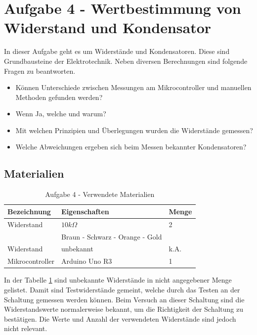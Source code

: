 \section{Aufgabe 4 - Wertbestimmung von Widerstand und Kondensator}
\label{sec:aufgabe-4---wertbestimmung-von-widerstand-und-kondensator}

In dieser Aufgabe geht es um Widerstände und Kondensatoren.
Diese sind Grundbausteine der Elektrotechnik.
Neben diversen Berechnungen sind folgende Fragen zu beantworten.

\begin{itemize}
    \item Können Unterschiede zwischen Messungen am Mikrocontroller und manuellen Methoden gefunden werden?
    \item Wenn Ja, welche und warum?
    \item Mit welchen Prinzipien und Überlegungen wurden die Widerstände gemessen?
    \item Welche Abweichungen ergeben sich beim Messen bekannter Kondensatoren?
\end{itemize}

\subsection{Materialien}
\label{subsec:a4-materialien}

\begin{table}[h]
    \centering
    \caption{Aufgabe 4 - Verwendete Materialien}
    \label{tab:a4-materialien}
    \begin{tabular}{| l | l | l |}
        \hline
        Bezeichnung & Eigenschaften & Menge \\
        \hline
        Widerstand  & $10k\Omega$   & 2     \\
        & Braun - Schwarz - Orange - Gold & \\
        Widerstand & unbekannt & k.A. \\
        Mikrocontroller & Arduino Uno R3 & 1 \\
        \hline
    \end{tabular}
\end{table}

In der Tabelle \ref{tab:a4-materialien} sind unbekannte Widerstände in nicht angegebener Menge gelistet.
Damit sind Testwiderstände gemeint, welche durch das Testen an der Schaltung gemessen werden können.
Beim Versuch an dieser Schaltung sind die Widerstandswerte normalerweise bekannt, um die Richtigkeit der Schaltung zu bestätigen.
Die Werte und Anzahl der verwendeten Widerstände sind jedoch nicht relevant.

